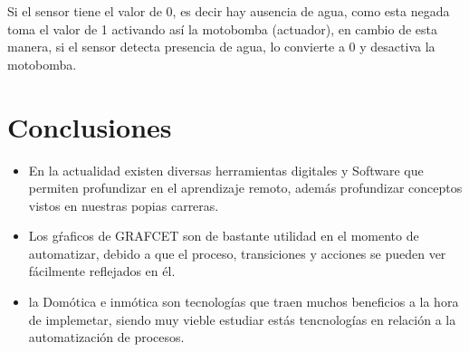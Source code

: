 \documentclass[journal, spanish]{IEEEtran}
\begin{document}
Si el sensor tiene el valor de 0, es decir hay ausencia de agua, como esta negada toma el valor de 1 activando así la motobomba (actuador), en cambio de esta manera, si el sensor detecta presencia de agua, lo convierte a 0 y desactiva la motobomba.
\section{Conclusiones}
\begin{itemize}
    \item En la actualidad existen diversas herramientas digitales y Software que permiten profundizar en el aprendizaje remoto, además profundizar conceptos vistos en nuestras popias carreras.
    \item Los gŕaficos de GRAFCET son de bastante utilidad en el momento de automatizar, debido a que el proceso, transiciones y acciones se pueden ver fácilmente reflejados en él.
    \item la Domótica e inmótica son tecnologías que traen muchos beneficios a la hora de implemetar, siendo muy vieble estudiar estás tencnologías en relación a la automatización de procesos.

\end{itemize}
\end{document}
